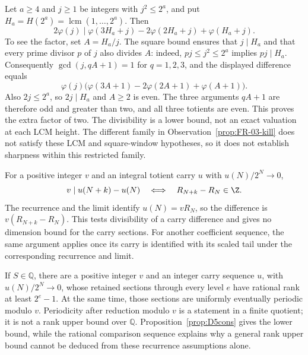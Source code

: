 \begin{prop}\label{prop:FR-02-inv}
Let $a\ge4$ and $j\ge1$ be integers with $j^2\le2^a$, and put
$H_a=H(2^a)=\operatorname{lcm}(1,\ldots,2^a)$. Then
\[
 2\varphi(j)\mid
 \varphi(3H_a+j)-2\varphi(2H_a+j)+\varphi(H_a+j).
\]
To see the factor, set $A=H_a/j$. The square bound ensures that $j\mid H_a$
and that every prime divisor $p$ of $j$ also divides $A$: indeed,
$pj\le j^2\le2^a$ implies $pj\mid H_a$. Consequently
$\gcd(j,qA+1)=1$ for $q=1,2,3$, and the displayed difference equals
\[
 \varphi(j)\bigl(\varphi(3A+1)-2\varphi(2A+1)+\varphi(A+1)\bigr).
\]
Also $2j\le2^a$, so $2j\mid H_a$ and $A\ge2$ is even. The three
arguments $qA+1$ are therefore odd and greater than two, and all three
totients are even. This proves the extra factor of two.
The divisibility is a lower bound, not an exact valuation at each LCM
height. The different family in Observation~\ref{prop:FR-03-kill} does
not satisfy these LCM and square-window hypotheses, so it does not
establish sharpness within this restricted family.
\end{prop}

\begin{prop}\label{prop:CP-01-inv}
For a positive integer $v$ and an integral totient carry $u$ with
$u(N)/2^N\to0$,
\[
 v\mid u(N+k)-u(N)\quad\Longleftrightarrow\quad R_{N+k}-R_N\in\Z.
\]
The recurrence and the limit identify $u(N)=vR_N$, so the
difference is $v(R_{N+k}-R_N)$. This tests divisibility of a carry
difference and gives no dimension bound for the carry sections.
For another coefficient sequence, the same argument applies once
its carry is identified with its scaled tail under the corresponding
recurrence and limit.
\end{prop}

\begin{prop}\label{prop:CP-02}
If $S\in\mathbb Q$, there are a positive integer $v$ and an
integer carry sequence $u$, with $u(N)/2^N\to0$, whose retained
sections through every
level $e$ have rational rank at least $2^e-1$. At the same time, those
sections are uniformly eventually periodic modulo $v$.
Periodicity after reduction modulo $v$ is a statement in a finite
quotient; it is not a rank upper bound over $\mathbb Q$.
Proposition~\ref{prop:D5cons} gives the lower bound, while the rational
comparison sequence explains why a general rank upper bound cannot
be deduced from these recurrence assumptions alone.
\end{prop}

